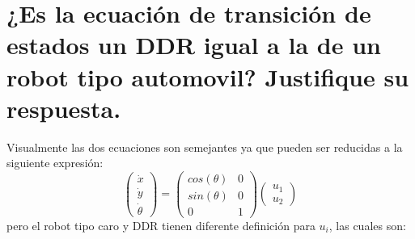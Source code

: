 \section{¿Es la ecuación de transición de estados un DDR igual a la de un robot tipo automovil? Justifique su respuesta.}
Visualmente las dos ecuaciones son semejantes ya que pueden ser reducidas a la siguiente expresión:
\begin{equation*}
    \begin{pmatrix}
        \dot{x} \\
        \dot{y} \\
        \dot{\theta}
    \end{pmatrix} =
    \begin{pmatrix}
        cos(\theta) & 0 \\
        sin(\theta) & 0 \\
        0           & 1
    \end{pmatrix} \begin{pmatrix}
        u_1 \\
        u_2
    \end{pmatrix}
\end{equation*}
pero el robot tipo caro y DDR tienen diferente definición para $u_i$, las cuales son:\\

